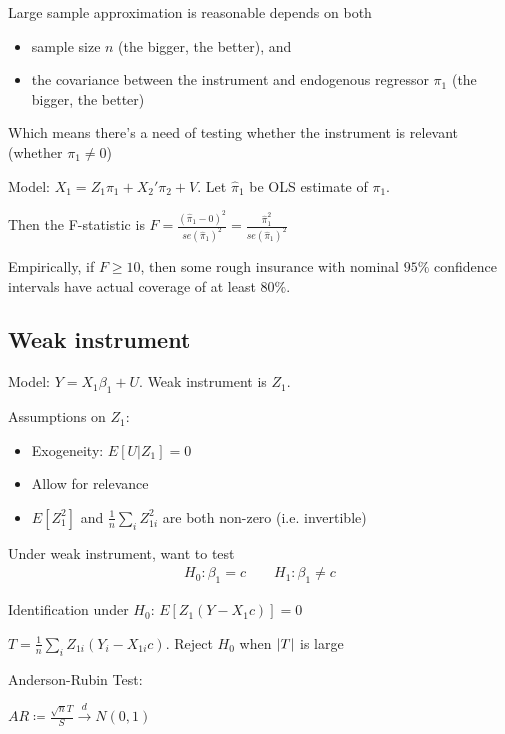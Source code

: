 \documentclass[10pt,landscape]{article}
\begin{document}
\begin{multicols}{3}
Large sample approximation is reasonable depends on both 
\begin{itemize}
  \item sample size $n$ (the bigger, the better), and
  \item the covariance between the instrument and endogenous regressor $\pi_1$ (the bigger, the better)
\end{itemize}

Which means there's a need of testing whether the instrument is relevant (whether $\pi_1 \neq 0$)

\begin{adjustwidth}{.3cm}{0cm}
  Model: $X_1 = Z_1 \pi_1 + X_2' \pi_2 + V$. Let $\hat{\pi}_1$ be OLS estimate of $\pi_1$. 

  Then the F-statistic is $F = \frac{(\hat{\pi}_1 - 0)^2}{se({\hat{\pi}_1})^2} = \frac{\hat{\pi}_1^2}{se({\hat{\pi}_1})^2}$

  Empirically, if $F \geq 10$, then some rough insurance with nominal $95\%$ conﬁdence intervals have actual coverage of at least $80\%$.
\end{adjustwidth}

\subsection{Weak instrument}

Model: $Y = X_1 \beta_1 + U$. Weak instrument is $Z_1$. 

Assumptions on $Z_1$: 
\begin{itemize}
  \item Exogeneity: $E[U|Z_1] = 0$
  \item Allow for relevance
  \item $E[Z_1^2]$ and $\frac{1}{n} \sum_i Z_{1i}^2$ are both non-zero (i.e. invertible)
\end{itemize}

Under weak instrument, want to test
\begin{align*}
  H_0 : \beta_1 = c \quad \quad H_1 : \beta_1 \neq c
\end{align*}

Identification under $H_0$: $E[Z_1(Y - X_1 c)] = 0$

\then $T = \frac{1}{n} \sum_i Z_{1i} (Y_i - X_{1i}c)$. Reject $H_0$ when $\left| T \right|$ is large

Anderson-Rubin Test: 

\begin{adjustwidth}{.3cm}{0cm}
$AR \coloneqq \frac{\sqrt{n}T}{S} \xrightarrow{d} N(0, 1)$


\end{adjustwidth}
\end{multicols}
\end{document}

